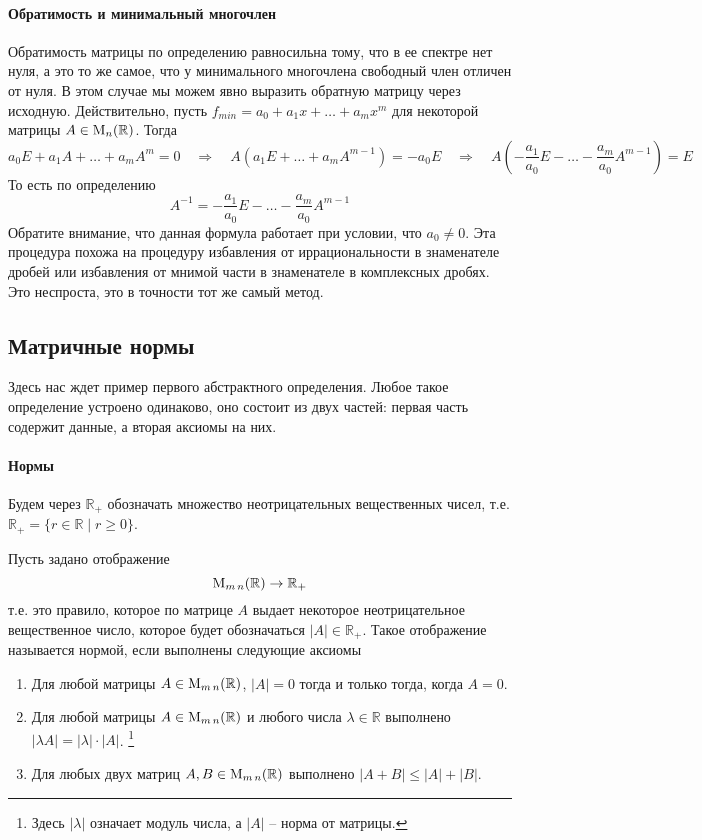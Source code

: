 \paragraph{Обратимость и минимальный многочлен}

Обратимость матрицы по определению равносильна тому, что в ее спектре нет нуля, а это то же самое, что у минимального многочлена свободный член отличен от нуля.
В этом случае мы можем явно выразить обратную матрицу через исходную.
Действительно, пусть $f_{min} = a_0 + a_1 x + \ldots + a_m x^m$ для некоторой матрицы $A\in \operatorname{M}_{n}(\mathbb R)$.
Тогда
\[
a_0E + a_1 A + \ldots + a_m A^m =  0 \quad\Rightarrow\quad  A (a_1 E + \ldots + a_m A^{m-1}) =  -a_0 E \quad\Rightarrow\quad A \left(-\frac{a_1}{a_0} E - \ldots -\frac{ a_m}{a_0} A^{m-1}\right) = E
\]
То есть по определению
\[
A^{-1} = -\frac{a_1}{a_0} E - \ldots -\frac{ a_m}{a_0} A^{m-1}
\]
Обратите внимание, что данная формула работает при условии, что $a_0 \neq 0$.
Эта процедура похожа на процедуру избавления от иррациональности в знаменателе дробей или избавления от мнимой части в знаменателе в комплексных дробях.
Это неспроста, это в точности тот же самый метод.


\subsection{Матричные нормы}

Здесь нас ждет пример первого абстрактного определения.
Любое такое определение устроено одинаково, оно состоит из двух частей: первая часть содержит данные, а вторая аксиомы на них.

\paragraph{Нормы}

Будем через $\mathbb R_+$ обозначать множество неотрицательных вещественных чисел, т.е. $\mathbb R_+ = \{r\in \mathbb R\mid r \geqslant 0\}$.

Пусть задано отображение 
\[
\operatorname{M}_{m\,n}(\mathbb R)\to \mathbb R_+
\]
т.е. это правило, которое по матрице $A$ выдает некоторое неотрицательное вещественное число, которое будет обозначаться $|A|\in\mathbb R_+$.
Такое отображение называется нормой, если выполнены следующие аксиомы
\begin{enumerate}
\item Для любой матрицы $A\in\operatorname{M}_{m\,n}(\mathbb R)$, $|A| = 0$ тогда и только тогда, когда $A = 0$.

\item Для любой матрицы $A\in\operatorname{M}_{m\,n}(\mathbb R)$ и любого числа $\lambda\in\mathbb R$ выполнено $|\lambda A| = |\lambda| \cdot |A|$.%
\footnote{Здесь $|\lambda|$ означает модуль числа, а $|A|$ -- норма от матрицы.}

\item Для любых двух матриц $A, B \in\operatorname{M}_{m\,n}(\mathbb R)$ выполнено $|A + B|\leqslant |A| + |B|$.
\end{enumerate}


